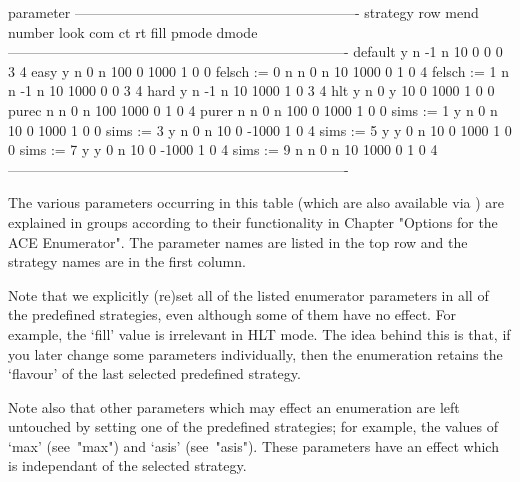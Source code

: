     \begintt
                                         parameter
                -------------------------------------------------------------
    strategy    row  mend  number  look  com    ct     rt  fill  pmode  dmode
    -------------------------------------------------------------------------
    default       y     n      -1     n   10     0      0     0      3      4
    easy          y     n       0     n  100     0   1000     1      0      0
    felsch := 0   n     n       0     n   10  1000      0     1      0      4
    felsch := 1   n     n      -1     n   10  1000      0     0      3      4
    hard          y     n      -1     n   10  1000      1     0      3      4
    hlt           y     n       0     y   10     0   1000     1      0      0
    purec         n     n       0     n  100  1000      0     1      0      4
    purer         n     n       0     n  100     0   1000     1      0      0
    sims := 1     y     n       0     n   10     0   1000     1      0      0
    sims := 3     y     n       0     n   10     0  -1000     1      0      4
    sims := 5     y     y       0     n   10     0   1000     1      0      0
    sims := 7     y     y       0     n   10     0  -1000     1      0      4
    sims := 9     n     n       0     n   10  1000      0     1      0      4
    -------------------------------------------------------------------------
    \endtt

    The  various  parameters  occurring  in  this table  (which  are  also
    available  via {\GAP})  are  explained in  groups  according to  their
    functionality  in  Chapter  "Options  for the  ACE  Enumerator".   The
    parameter names are  listed in the top row and  the strategy names are
    in the first column.

    Note  that  we  explicitly   (re)set  all  of  the  listed  enumerator
    parameters in all of the  predefined strategies, even although some of
    them have  no effect. For example,  the `fill' value  is irrelevant in
    HLT mode.   The idea  behind this  is that, if  you later  change some
    parameters individually, then the enumeration retains the `flavour' of
    the  last   selected  predefined  strategy.   

    Note also  that other parameters  which may effect an  enumeration are
    left  untouched  by setting  one  of  the  predefined strategies;  for
    example,  the values  of  `max' (see~"max")  and `asis'  (see~"asis").
    These parameters have  an effect which is independant  of the selected
    strategy.

